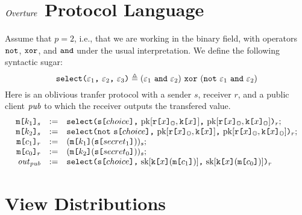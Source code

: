 \section{$\mathit{Overture}$ Protocol Language}

\begin{example}
  \label{exampl-ot}
  Assume that $p = 2$, i.e., that we are working in the binary field, with operators $\texttt{not}$,
  $\texttt{xor}$, and $\texttt{and}$ under the usual interpretation. We define the following syntactic sugar:
  $$
  \select{\be_1}{\be_2}{\be_3} \defeq (\be_1\ \eand\ \be_2)\ \exor\ (\enot\ \be_1\ \eand\ \be_2)
  $$
  Here is an oblivious tranfer protocol with a sender $s$, receiver $r$, and a public client
  $\mathit{pub}$ to which the receiver outputs the transfered value. 
  $$
  \begin{array}{rcl}
    \elab{\mesg{k_1}}{s} &:=&
    \elab{\select{\secret{choice}}{\pk{\elab{\flip{x}}{\Oracle}}{\key{x}}}{\pk{\elab{\flip{x}}{\Oracle}}{\elab{\key{x}}{\Oracle}}}}{r};\\
    \elab{\mesg{k_2}}{s} &:=&
    \elab{\select{\enot\ \secret{choice}}{\pk{\elab{\flip{x}}{\Oracle}}{\key{x}}}{\pk{\elab{\flip{x}}{\Oracle}}{\elab{\key{x}}{\Oracle}}}}{r};\\
    \elab{\mesg{c_1}}{r} &:=& \elab{(\mesg{k_1}(\secret{secret_1}))}{s};\\
    \elab{\mesg{c_0}}{r} &:=& \elab{(\mesg{k_2}(\secret{secret_0}))}{s};\\
    \elab{\outv}{\cpub} &:=& \elab{\select{\secret{choice}}{\sk{\key{x}(\mesg{c_1})}}{\sk{\key{x}(\mesg{c_0})}}}{r}
  \end{array}
  $$
\end{example}

%


\section{View Distributions}


